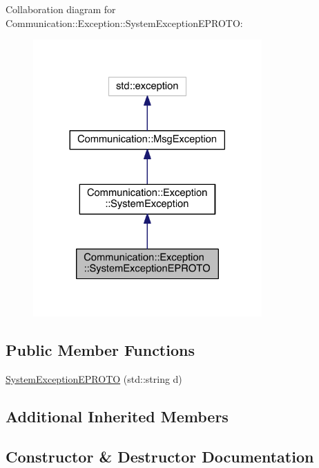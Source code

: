 Collaboration diagram for Communication\+:\+:Exception\+:\+:System\+Exception\+E\+P\+R\+O\+T\+O\+:\nopagebreak
\begin{figure}[H]
\begin{center}
\leavevmode
\includegraphics[width=248pt]{class_communication_1_1_exception_1_1_system_exception_e_p_r_o_t_o__coll__graph}
\end{center}
\end{figure}
\subsection*{Public Member Functions}
\begin{DoxyCompactItemize}
\item 
\hyperlink{class_communication_1_1_exception_1_1_system_exception_e_p_r_o_t_o_a9fac4ef887f7eb76337dc839f261e2f1}{System\+Exception\+E\+P\+R\+O\+T\+O} (std\+::string d)
\end{DoxyCompactItemize}
\subsection*{Additional Inherited Members}


\subsection{Constructor \& Destructor Documentation}
\hypertarget{class_communication_1_1_exception_1_1_system_exception_e_p_r_o_t_o_a9fac4ef887f7eb76337dc839f261e2f1}{}

